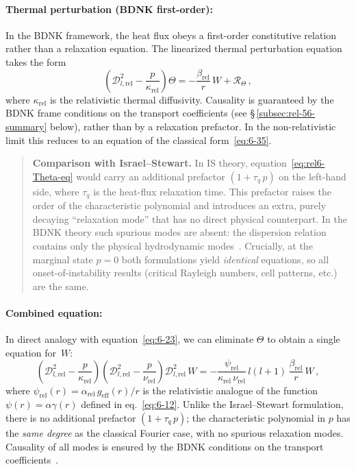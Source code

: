 \paragraph{Thermal perturbation (BDNK first-order):}
In the BDNK framework, the heat flux obeys a first-order constitutive
relation rather than a relaxation equation.  The linearized thermal
perturbation equation takes the form
\begin{equation}
  \left(\mathscr{D}_{l,\mathrm{rel}}^{2}
        - \frac{p}{\kappa_{\mathrm{rel}}}\right)\Theta
  = -\frac{\beta_{\mathrm{rel}}}{r}\,W
    + \mathcal{R}_{\Theta} \,,
  \label{eq:rel6-Theta-eq}
\end{equation}
where $\kappa_{\mathrm{rel}}$ is the relativistic thermal diffusivity.  Causality
is guaranteed by the BDNK frame conditions on the transport
coefficients (see \S\,\ref{subsec:rel-56-summary} below), rather than
by a relaxation prefactor.  In the non-relativistic limit this reduces
to an equation of the classical form~\eqref{eq:6-35}.

\begin{quote}
\textbf{Comparison with Israel--Stewart.}
In IS theory, equation~\eqref{eq:rel6-Theta-eq} would carry an
additional prefactor $(1 + \tau_{q}\,p)$ on the left-hand side, where
$\tau_{q}$ is the heat-flux relaxation time.  This prefactor raises the
order of the characteristic polynomial and introduces an extra,
purely decaying ``relaxation mode'' that has no direct physical
counterpart.  In the BDNK theory such spurious modes are absent: the
dispersion relation contains only the physical hydrodynamic
modes~\cite{BemficaDN2018,Kovtun2019}.  Crucially, at the marginal state
$p = 0$ both formulations yield \emph{identical} equations, so all
onset-of-instability results (critical Rayleigh numbers, cell
patterns, etc.) are the same.
\end{quote}

\paragraph{Combined equation:}
In direct analogy with equation~\eqref{eq:6-23}, we can eliminate
$\Theta$ to obtain a single equation for~$W$:
\begin{equation}
  \left(\mathscr{D}_{l,\mathrm{rel}}^{2}
          - \frac{p}{\kappa_{\mathrm{rel}}}\right)\!
  \left(\mathscr{D}_{l,\mathrm{rel}}^{2}
          - \frac{p}{\nu_{\mathrm{rel}}}\right)\!
  \mathscr{D}_{l,\mathrm{rel}}^{2}\,W
  = -\frac{\psi_{\mathrm{rel}}}{\kappa_{\mathrm{rel}}\,
     \nu_{\mathrm{rel}}}\,l(l+1)\,
     \frac{\beta_{\mathrm{rel}}}{r}\,W \,,
  \label{eq:rel6-combined}
\end{equation}
where $\psi_{\mathrm{rel}}(r) = \alpha_{\mathrm{rel}}\,
g_{\mathrm{eff}}(r)/r$ is the relativistic analogue of the function
$\psi(r) = \alpha\gamma(r)$ defined in eq.~\eqref{eq:6-12}.  Unlike
the Israel--Stewart formulation, there is no additional prefactor
$(1 + \tau_{q}\,p)$; the characteristic polynomial in $p$ has the
\emph{same degree} as the classical Fourier case, with no spurious
relaxation modes.  Causality of all modes is ensured by the BDNK
conditions on the transport coefficients~\cite{BemficaDN2018,Kovtun2019,
HoultKovtun2020}.

